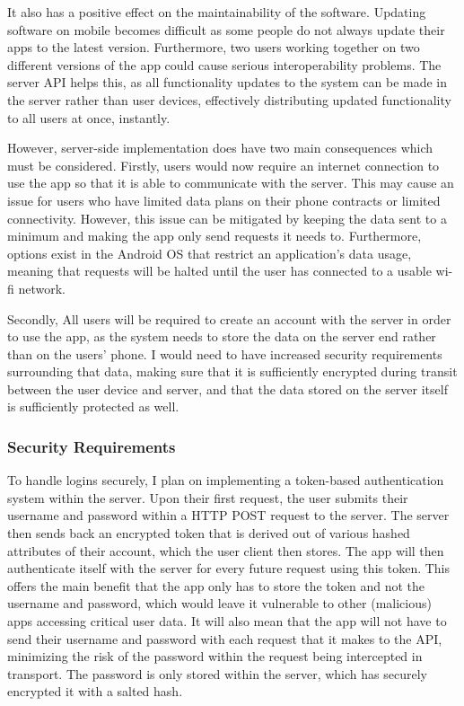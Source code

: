 It also has a positive effect on the maintainability of the software. 
Updating software on mobile becomes difficult as some people do not always update their apps to the latest version. 
Furthermore, two users working together on two different versions of the app could cause serious interoperability problems.
The server API helps this, as all functionality updates to the system can be made in the server rather than user devices, effectively distributing updated functionality to all users at once, instantly.

However, server-side implementation does have two main consequences which must be considered. 
Firstly, users would now require an internet connection to use the app so that it is able to communicate with the server.
This may cause an issue for users who have limited data plans on their phone contracts or limited connectivity. 
However, this issue can be mitigated by keeping the data sent to a minimum and making the app only send requests it needs to.
Furthermore, options exist in the Android OS that restrict an application's data usage, meaning that requests will be halted until the user has connected to a usable wi-fi network.

Secondly, All users will be required to create an account with the server in order to use the app, as the system needs to store the data on the server end rather than on the users' phone.
I would need to have increased security requirements surrounding that data, making sure that it is sufficiently encrypted during transit between the user device and server, and that the data stored on the server itself is sufficiently protected as well.

\subsubsection{Security Requirements}
To handle logins securely, I plan on implementing a token-based authentication system within the server. 
Upon their first request, the user submits their username and password within a HTTP POST request to the server.
The server then sends back an encrypted token that is derived out of various hashed attributes of their account, which the user client then stores.
The app will then authenticate itself with the server for every future request using this token.
This offers the main benefit that the app only has to store the token and not the username and password, which would leave it vulnerable to other (malicious) apps accessing critical user data.
It will also mean that the app will not have to send their username and password with each request that it makes to the API, minimizing the risk of the password within the request being intercepted in transport.
The password is only stored within the server, which has securely encrypted it with a salted hash.


